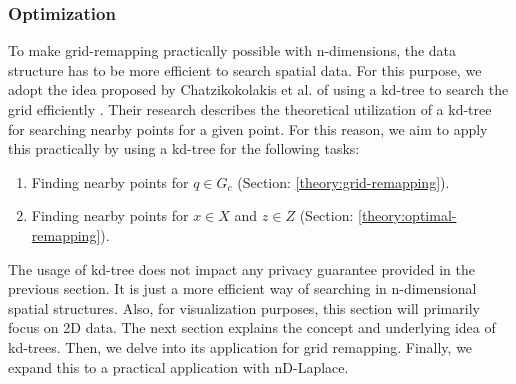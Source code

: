 \subsubsection{Optimization}
To make grid-remapping practically possible with n-dimensions, the data structure has to be more efficient to search spatial data. For this purpose, we adopt the idea proposed by Chatzikokolakis et al. of using a kd-tree to search the grid efficiently \citep{chatzikokolakis_efficient_2017}.
Their research describes the theoretical utilization of a kd-tree for searching nearby points for a given point.
For this reason, we aim to apply this practically by using a kd-tree for the following tasks:
\begin{enumerate}
  \item Finding nearby points for $q \in G_c$ (Section: \ref{theory:grid-remapping}).
  \item Finding nearby points for $x \in X$ and $z \in Z$ (Section: \ref{theory:optimal-remapping}).
\end{enumerate}
The usage of kd-tree does not impact any privacy guarantee provided in the previous section. It is just a more efficient way of searching in n-dimensional spatial structures. Also, for visualization purposes, this section will primarily focus on 2D data. \newline
The next section explains the concept and underlying idea of kd-trees.
Then, we delve into its application for grid remapping.
Finally, we expand this to a practical application with nD-Laplace.
\newpage
